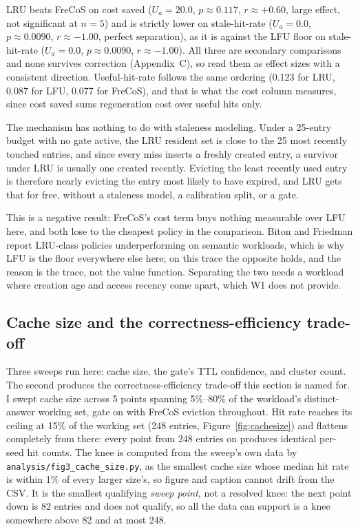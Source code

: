 \documentclass[10pt]{article}
\begin{document}
LRU beats FreCoS on cost saved ($U_a=20.0$, $p\approx0.117$, $r\approx+0.60$, large effect,
not significant at $n=5$) and is strictly lower on stale-hit-rate ($U_a=0.0$,
$p\approx0.0090$, $r\approx-1.00$, perfect separation), as it is against the LFU floor on
stale-hit-rate ($U_a=0.0$, $p\approx0.0090$, $r\approx-1.00$). All three are secondary
comparisons and none survives correction (Appendix~C), so read them as effect sizes with a
consistent direction. Useful-hit-rate follows the same ordering (0.123 for LRU, 0.087 for
LFU, 0.077 for FreCoS), and that is what the cost column measures, since cost saved sums
regeneration cost over useful hits only.

The mechanism has nothing to do with staleness modeling. Under a 25-entry budget with no gate
active, the LRU resident set is close to the 25 most recently touched entries, and since
every miss inserts a freshly created entry, a survivor under LRU is usually one created
recently. Evicting the least recently used entry is therefore nearly evicting the entry most
likely to have expired, and LRU gets that for free, without a staleness model, a calibration
split, or a gate.

This is a negative result: FreCoS's cost term buys nothing measurable over LFU here, and both
lose to the cheapest policy in the comparison. Biton and Friedman report LRU-class policies
underperforming on semantic workloads, which is why LFU is the floor everywhere else here; on
this trace the opposite holds, and the reason is the trace, not the value function. Separating
the two needs a workload where creation age and access recency come apart, which W1 does not
provide.

\subsection{Cache size and the correctness-efficiency trade-off}
\label{ssec:sweeps}

Three sweeps run here: cache size, the gate's TTL confidence, and cluster count. The second
produces the correctness-efficiency trade-off this section is named for. I swept cache size
across 5 points spanning 5\%--80\% of the workload's distinct-answer
working set, gate on with FreCoS eviction throughout. Hit rate reaches its ceiling at 15\%
of the working set (248 entries, Figure~\ref{fig:cachesize}) and flattens completely from
there: every point from 248 entries on produces identical per-seed hit counts. The knee is
computed from the sweep's own data by \texttt{analysis/fig3\_cache\_size.py}, as the smallest
cache size whose median hit rate is within 1\% of every larger size's, so figure and caption
cannot drift from the CSV. It is the smallest qualifying \emph{sweep point}, not a resolved
knee: the next point down is 82 entries and does not qualify, so all the data can support is a
knee somewhere above 82 and at most 248.
\end{document}
